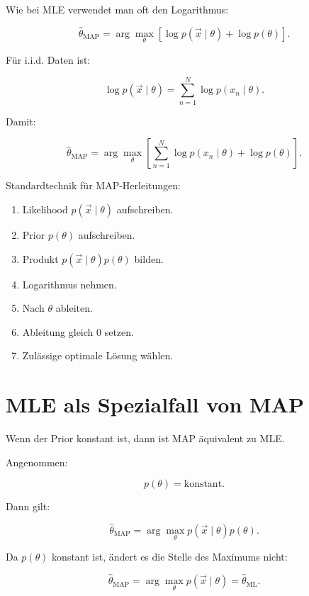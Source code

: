 Wie bei MLE verwendet man oft den Logarithmus:

\[
    \hat{\theta}_{\mathrm{MAP}}
    =
    \arg\max_{\theta}
    \left[
        \log p(\vec{x} \mid \theta)
        +
        \log p(\theta)
    \right].
\]

Für i.i.d. Daten ist:

\[
    \log p(\vec{x} \mid \theta)
    =
    \sum_{n=1}^{N}
    \log p(x_n \mid \theta).
\]

Damit:

\[
    \hat{\theta}_{\mathrm{MAP}}
    =
    \arg\max_{\theta}
    \left[
        \sum_{n=1}^{N}
        \log p(x_n \mid \theta)
        +
        \log p(\theta)
    \right].
\]

\begin{examtipbox}
Standardtechnik für MAP-Herleitungen:

\begin{enumerate}
    \item Likelihood \(p(\vec{x}\mid\theta)\) aufschreiben.
    \item Prior \(p(\theta)\) aufschreiben.
    \item Produkt \(p(\vec{x}\mid\theta)p(\theta)\) bilden.
    \item Logarithmus nehmen.
    \item Nach \(\theta\) ableiten.
    \item Ableitung gleich \(0\) setzen.
    \item Zulässige optimale Lösung wählen.
\end{enumerate}
\end{examtipbox}

\section{MLE als Spezialfall von MAP}

Wenn der Prior konstant ist, dann ist MAP äquivalent zu MLE.

Angenommen:

\[
    p(\theta) = \text{konstant}.
\]

Dann gilt:

\[
    \hat{\theta}_{\mathrm{MAP}}
    =
    \arg\max_{\theta}
    p(\vec{x}\mid\theta)p(\theta).
\]

Da \(p(\theta)\) konstant ist, ändert es die Stelle des Maximums nicht:

\[
    \hat{\theta}_{\mathrm{MAP}}
    =
    \arg\max_{\theta}
    p(\vec{x}\mid\theta)
    =
    \hat{\theta}_{\mathrm{ML}}.
\]

